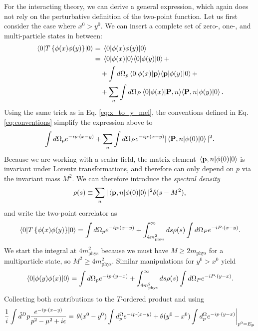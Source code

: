 \documentclass{article}
\numberwithin{equation}{section}
\begin{document}
For the interacting theory, we can derive a general expression, which again does not rely on the perturbative definition of the two-point function. Let us first consider the case where $x^0 > y^0$. We can insert a complete set of zero-, one-, and multi-particle states in between:
\begin{equation}
\begin{aligned}
    \ev{T\left\{\phi(x) \phi(y)\right\}}{0} &= \ev{\phi(x) \phi(y)}{0} \\
    &= \ev{\phi(x)}{0} \!\! \ev{\phi(y)}{0} +\\
    &\quad + \int d\Omega_p \mel{0}{\phi(x)}{\vb{p}}\!\!\mel{\vb{p}}{\phi(y)}{0} +\\
    &\quad + \sum_n \int d\Omega_P \mel{0}{\phi(x)}{\vb{P}, n}\!\! \mel{\vb{P}, n}{\phi(y)}{0}.
\end{aligned}
\end{equation}
Using the same trick as in Eq. \ref{eq:x_to_y_mel}, the conventions defined in Eq. \ref{eq:conventions} simplify the expression above to 
\begin{equation}
    \int d\Omega_p e^{-ip \cdot (x-y)} + \sum_n \int d\Omega_P e^{-ip \cdot (x-y)} |\mel{\vb{P}, n}{\phi(0)}{0}|^2.
\end{equation}
Because we are working with a scalar field, the matrix element $\mel{\vb{p}, n}{\phi(0)}{0}$ is invariant under Lorentz transformations, and therefore can only depend on $p$ via the invariant mass $M^2$. We can therefore introduce the \textit{spectral density}
\begin{equation}
    \rho(s) \equiv \sum_n |\mel{\vb{p}, n}{\phi(0)}{0}|^2 \delta(s-M^2),
\end{equation}
and write the two-point correlator as 
\begin{equation}
    \ev{T\left\{\phi(x) \phi(y)\right\}}{0} = \int d\Omega_p e^{-ip \cdot (x-y)} + \int_{4m_{\text{phys}}^2}^\infty ds \rho(s) \int d\Omega_P e^{-iP \cdot (x-y)}.
\end{equation}
We start the integral at $4m_{\text{phys}}^2$ because we must have $M \geq 2m_{\text{phys}}$ for a multiparticle state, so $M^2 \geq 4m_{\text{phys}}^2$.
Similar manipulations for $y^0 > x^0$ yield
\begin{equation}
    \ev{\phi(y) \phi(x)}{0} = \int d\Omega_p e^{-ip \cdot (y-x)} + \int_{4m_{\text{phys}}^2}^\infty ds \rho(s) \int d\Omega_P e^{-iP \cdot (y-x)}.
\end{equation}
Collecting both contributions to the $T$-ordered product and using 
\begin{equation}
    \frac{1}{i} \int \hat{d}^Dp \frac{e^{-ip \cdot (x-y)}}{p^2-\mu^2 + i\epsilon} = \eval{\theta(x^0 - y^0)\int d^\Omega_p e^{-ip \cdot (x-y)} + \theta(y^0 - x^0) \int d^\Omega_p e^{-ip \cdot (y-x)}}_{p^0 = E_{\vb{p}}}
\end{equation}
\end{document}
